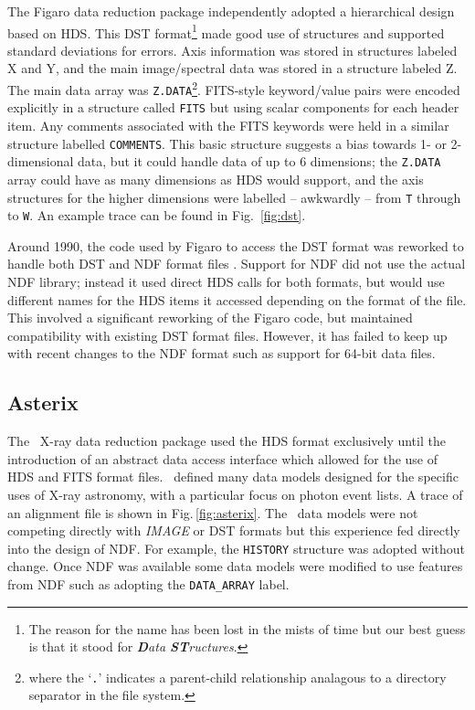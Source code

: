 \documentclass[final,authoryear,5p,times,twocolumn]{elsarticle}
\begin{document}
The Figaro data reduction package
\citep[][]{1988igbo.conf..448C,1993ASPC...52..219S}
independently adopted a hierarchical design based on HDS. This DST
format\footnote{The reason for the name has been lost in the mists of
  time but our best guess is that it stood for \emph{\textbf{D}ata
    \textbf{ST}ructures}.} made good use of structures and supported
standard deviations for errors. Axis information was stored in
structures labeled X and Y, and the main image/spectral data was
stored in a structure labeled Z. The main data array was
\texttt{Z.DATA}\footnote{where the `\texttt{.}' indicates a
  parent-child relationship analagous to a directory separator in the
  file system.}. FITS-style keyword/value pairs were encoded
explicitly in a structure called \texttt{FITS} but using scalar
components for each header item. Any comments associated with the FITS
keywords were held in a similar structure labelled
\texttt{COMMENTS}. This basic structure suggests a bias towards 1- or
2-dimensional data, but it could handle data of up to 6 dimensions;
the \texttt{Z.DATA} array could have as many dimensions as HDS would
support, and the axis structures for the higher dimensions were
labelled -- awkwardly -- from \texttt{T} through to \texttt{W}. An
example trace can be found in Fig.~\ref{fig:dst}.

Around 1990, the code used by Figaro to access the DST format was
reworked to handle both DST and NDF format files
\citep{1990STARB...6...18S}. Support for NDF did
not use the actual NDF library; instead it used direct HDS calls for
both formats, but would use different names for the HDS items it
accessed depending on the format of the file. This involved a
significant reworking of the Figaro code, but maintained compatibility
with existing DST format files. However, it has failed to keep up with
recent changes to the NDF format such as support for 64-bit data
files.

\subsection{Asterix}

The \asterix\ X-ray data reduction package
\citep{1987JBIS...40..185P,SUN98,1992STARB...9....3S} used the HDS
format exclusively until the introduction of an abstract data access
interface \citep{1995ASPC...77..199A} which allowed for the use of HDS
and FITS format files. \asterix\ defined many data models designed for
the specific uses of X-ray astronomy, with a particular focus on
photon event lists. A trace of an alignment file is shown in
Fig.\,\ref{fig:asterix}. The \asterix\ data models were not competing directly with \emph{IMAGE} or
DST formats but this experience fed directly into the design of NDF.
For example, the \texttt{HISTORY} structure was adopted without change. Once
NDF was available some data models were modified to use features from
NDF such as adopting the \texttt{DATA\_ARRAY} label.
\end{document}
